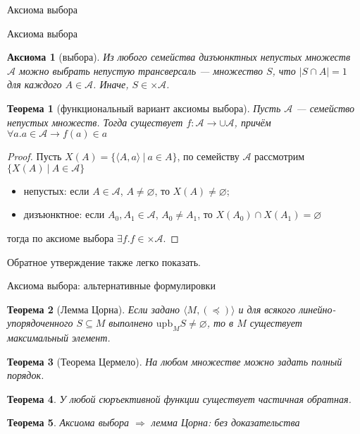 \documentclass[aspectratio=169]{beamer}
\newtheorem{axm}{Аксиома}[section]
\newtheorem{thm}{Теорема}[section]
\begin{document}
\begin{frame}
\begin{center}\LARGE Аксиома выбора\end{center}
\end{frame}

\begin{frame}{Аксиома выбора}
\begin{axm}[выбора]
Из любого семейства дизъюнктных непустых множеств $\mathcal{A}$ можно выбрать непустую трансверсаль --- 
множество $S$, что $|S \cap A| = 1$ для каждого $A\in\mathcal{A}$. Иначе, $S \in \times \mathcal{A}$.
\end{axm}

\begin{thm}[функциональный вариант аксиомы выбора]
Пусть $\mathcal{A}$ --- семейство непустых множеств. Тогда существует
$f : \mathcal{A} \rightarrow \cup \mathcal{A}$, причём $\forall a.a \in \mathcal{A} \rightarrow f(a) \in a$
\end{thm}

\begin{proof}
Пусть $X(A) = \{ \langle A, a \rangle \ |\ a \in A \}$, 
по семейству $\mathcal{A}$ рассмотрим $\{X(A)\ |\ A\in\mathcal{A}\}$
\begin{itemize}
\item непустых: если $A\in\mathcal{A}$, $A \ne \varnothing$, то $X(A) \ne \varnothing$;
\item дизъюнктное: если $A_0,A_1\in\mathcal{A}$, $A_0 \ne A_1$, то $X(A_0) \cap X(A_1) = \varnothing$
\end{itemize}
тогда по аксиоме выбора $\exists f.f \in \times \mathcal{A}$.
\end{proof}
Обратное утверждение также легко показать.
\end{frame}

\begin{frame}{Аксиома выбора: альтернативные формулировки}
\begin{thm}[Лемма Цорна]
Если задано $\langle M, (\preceq) \rangle$ и для всякого линейно-упорядоченного $S \subseteq M$ выполнено
$\text{upb}_M S \ne \varnothing$, то в $M$ существует максимальный элемент.
\end{thm}
\begin{thm}[Теорема Цермело]
На любом множестве можно задать полный порядок.
\end{thm}
\begin{thm}
У любой сюръективной функции существует частичная обратная.
\end{thm}

\begin{thm}
Аксиома выбора $\Rightarrow$ лемма Цорна: без доказательства
\end{thm}
\end{frame}
\end{document}
